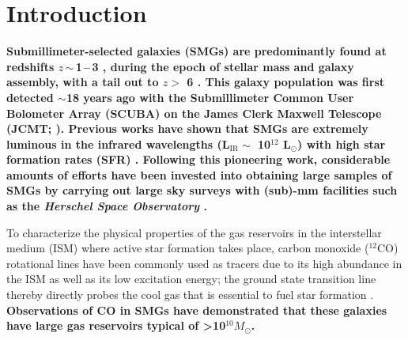 \documentclass[iop, revtex4]{emulateapj}
\newcommand{\Msun}{\mbox{$M_{\odot}$}}
\newcommand{\Lsun}{\mbox{L$_{\odot}$}}
\newcommand{\eg}{{\sl e.g.,~}}
\newcommand{\pmOne}{\mbox{$^{-1}$}}
\begin{document}
\section{Introduction}\label{sec:intro}
{\bf Submillimeter-selected galaxies (SMGs) are predominantly found at redshifts $z$\,$\sim$\,1\,--\,3 \citep{Chapman05a}, during the epoch of stellar mass and
galaxy assembly, with a tail out to $z>$ 6 \citep{Riechers13a}. This galaxy population was first detected 
$\sim$18 years ago with the Submillimeter Common User Bolometer Array (SCUBA) on the James
Clerk Maxwell Telescope (JCMT; \citealt{Smail97a, Hughes98a, Barger98a}). 
Previous works %
have shown that SMGs
 are extremely luminous in the infrared
 wavelengths (L$_\textrm{IR} \sim$ 10$^{12}$ \Lsun) with high star formation rates (SFR) \citep[$\gtrsim $ 500 \Msun yr\pmOne; see \eg reviews by][]{Lagache05a,Casey14a}.  Following this pioneering work, considerable amounts of efforts have been invested into 
obtaining large samples of SMGs by carrying out
  large sky surveys with (sub)-mm facilities such as the {\it Herschel Space Observatory} \citep[\eg H-ATLAS, SPT, HerMES; ][]{Eales10a,Carlstrom11a,Oliver12a}.  
  }
  
  To characterize the physical properties of the gas reservoirs in the interstellar medium (ISM) where active star formation takes place, carbon monoxide ($^{12}$CO) rotational lines have been commonly used as tracers due to its high abundance in the ISM as well as its low excitation energy; the ground state transition line thereby directly probes the cool gas that is essential to fuel star formation \citep[see \eg reviews by][]{Solomon05a,Carilli13a}.{ \bf Observations of CO in SMGs 
  have demonstrated that these galaxies have large gas reservoirs typical of \textgreater 10$^{10}$\Msun \citep[\eg][]{Frayer98a, Riechers11c, Neri03a, Riechers11d,Ivison11a,Bothwell13a}.}
\end{document}
